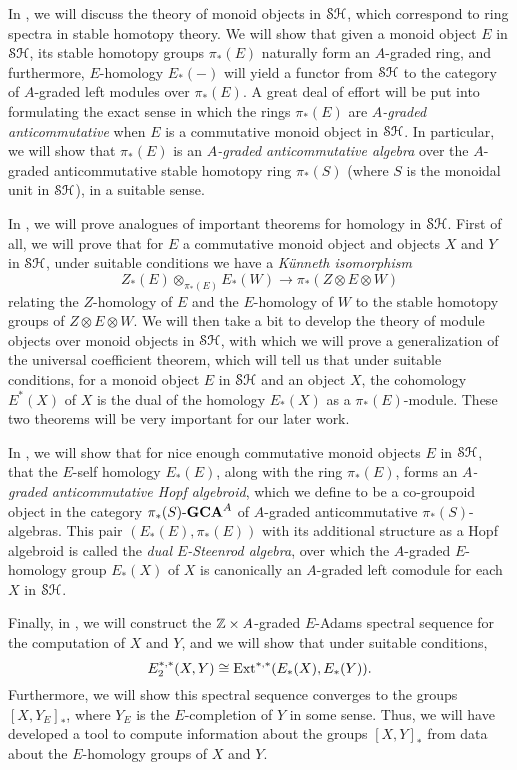 \documentclass[../main.tex]{subfiles}
\begin{document}
In , we will discuss the theory of monoid objects in $\mathcal{SH}$, which correspond to ring spectra in stable homotopy theory. We will show that given a monoid object $E$ in $\mathcal{SH}$, its stable homotopy groups $\pi_*(E)$ naturally form an $A$-graded ring, and furthermore, $E$-homology $E_*(-)$ will yield a functor from $\mathcal{SH}$ to the category of $A$-graded left modules over $\pi_*(E)$. A great deal of effort will be put into formulating the exact sense in which the rings $\pi_*(E)$ are \emph{$A$-graded anticommutative} when $E$ is a commutative monoid object in $\mathcal{SH}$. In particular, we will show that $\pi_*(E)$ is an \emph{$A$-graded anticommutative algebra} over the $A$-graded anticommutative stable homotopy ring $\pi_*(S)$ (where $S$ is the monoidal unit in $\mathcal{SH}$), in a suitable sense.

In , we will prove analogues of important theorems for homology in $\mathcal{SH}$. First of all, we will prove that for $E$ a commutative monoid object and objects $X$ and $Y$ in $\mathcal{SH}$, under suitable conditions we have a \emph{K\"unneth isomorphism}
\[Z_*(E)\otimes_{\pi_*(E)}E_*(W)\to\pi_*(Z\otimes E\otimes W)\]
relating the $Z$-homology of $E$ and the $E$-homology of $W$ to the stable homotopy groups of $Z\otimes E\otimes W$. We will then take a bit to develop the theory of module objects over monoid objects in $\mathcal{SH}$, with which we will prove a generalization of the universal coefficient theorem, which will tell us that under suitable conditions, for a monoid object $E$ in $\mathcal{SH}$ and an object $X$, the cohomology $E^*(X)$ of $X$ is the dual of the homology $E_*(X)$ as a $\pi_*(E)$-module. These two theorems will be very important for our later work.

In , we will show that for nice enough commutative monoid objects $E$ in $\mathcal{SH}$, that the $E$-self homology $E_*(E)$, along with the ring $\pi_*(E)$, forms an \emph{$A$-graded anticommutative Hopf algebroid}, which we define to be a co-groupoid object in the category $\pi_*(S)\text-\mathbf{GCA}^A$ of $A$-graded anticommutative $\pi_*(S)$-algebras. This pair $(E_*(E),\pi_*(E))$ with its additional structure as a Hopf algebroid is called the \emph{dual $E$-Steenrod algebra}, over which the $A$-graded $E$-homology group $E_*(X)$ of $X$ is canonically an $A$-graded left comodule for each $X$ in $\mathcal{SH}$.

Finally, in , we will construct the $\mathbb{Z}\times A$-graded $E$-Adams spectral sequence for the computation of $X$ and $Y$, and we will show that under suitable conditions,
\[E_2^{*,*}(X,Y)\cong\mathrm{Ext}^{*,*}(E_{*}(X),E_*(Y)).\]
Furthermore, we will show this spectral sequence converges to the groups ${[X,Y_E]}_*$, where $Y_E$ is the $E$-completion of $Y$ in some sense. Thus, we will have developed a tool to compute information about the groups ${[X,Y]}_*$ from data about the $E$-homology groups of $X$ and $Y$.

\end{document}
